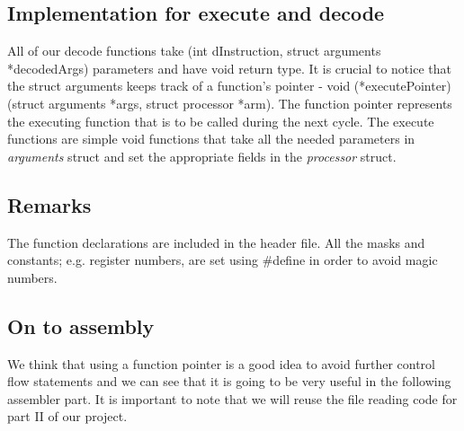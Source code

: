 \documentclass[11pt]{article}
\begin{document}
	 \subsection{Implementation for execute and decode}
	 All of our decode functions take (int dInstruction, struct arguments *decodedArgs) parameters and have void return type. It is crucial to notice that the struct arguments  keeps track of a function's pointer - void (*executePointer)(struct arguments *args, struct processor *arm). The function pointer represents the executing function that is to be called during the next cycle. The execute functions are simple void functions that take all the needed parameters in \textit{arguments} struct and set the appropriate fields in the \textit{processor} struct.
	 
	\subsection{Remarks}
	The function declarations are included in the header file. All the masks and constants; e.g. register numbers, are set using #define in order to avoid magic numbers. 
	\subsection{On to assembly}
	We think that using a function pointer is a good idea to avoid further control flow statements and we can see that it is going to be very useful in the following assembler part. It is important to note that we will reuse the file reading code for part II of our project.
\end{document}
